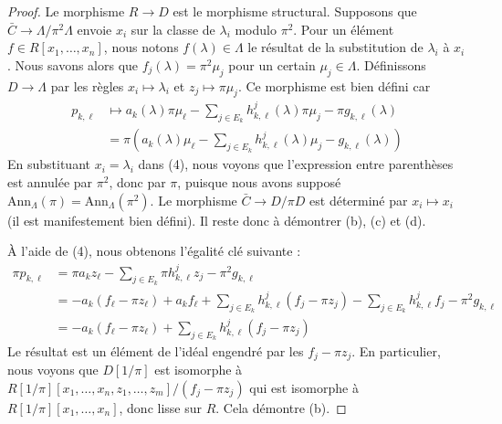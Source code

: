 \begin{proof}
\medskip\noindent
Le morphisme $R \to D$ est le morphisme structural.
Supposons que $\bar C \to \Lambda/\pi^2\Lambda$ envoie $x_i$
sur la classe de $\lambda_i$ modulo $\pi^2$. Pour un élément
$f \in R[x_1, \ldots, x_n]$, nous notons $f(\lambda) \in \Lambda$
le résultat de la substitution de $\lambda_i$ à $x_i$. Nous savons alors que
$f_j(\lambda) = \pi^2 \mu_j$ pour un certain $\mu_j \in \Lambda$.
Définissons $D \to \Lambda$ par les règles $x_i \mapsto \lambda_i$ et
$z_j \mapsto \pi\mu_j$. Ce morphisme est bien défini car
\begin{align*}
p_{k, \ell} & \mapsto
a_k(\lambda) \pi \mu_\ell -
\sum\nolimits_{j \in E_k} h_{k, \ell}^j(\lambda) \pi \mu_j
- \pi g_{k, \ell}(\lambda) \\
& =
\pi\left(a_k(\lambda) \mu_\ell -
\sum\nolimits_{j \in E_k} h_{k, \ell}^j(\lambda) \mu_j
- g_{k, \ell}(\lambda)\right)
\end{align*}
En substituant $x_i = \lambda_i$ dans (4), nous voyons que l'expression
entre parenthèses est annulée par $\pi^2$, donc par $\pi$, puisque nous avons supposé
$\text{Ann}_\Lambda(\pi) = \text{Ann}_\Lambda(\pi^2)$.
Le morphisme $\bar C \to D/\pi D$ est déterminé par $x_i \mapsto x_i$
(il est manifestement bien défini). Il reste donc à démontrer (b), (c) et (d).

\medskip\noindent
À l'aide de (4), nous obtenons l'égalité clé suivante :
\begin{align*}
\pi p_{k, \ell} & =
\pi a_k z_\ell - \sum\nolimits_{j \in E_k} \pi h_{k, \ell}^jz_j
- \pi^2 g_{k, \ell} \\
& =
- a_k (f_\ell - \pi z_\ell) + a_k f_\ell +
\sum\nolimits_{j \in E_k} h_{k, \ell}^j (f_j - \pi z_j) -
\sum\nolimits_{j \in E_k} h_{k, \ell}^j f_j - \pi^2 g_{k, \ell} \\
& =
-a_k(f_\ell - \pi z_\ell) +
\sum\nolimits_{j \in E_k} h_{k, \ell}^j(f_j - \pi z_j)
\end{align*}
Le résultat est un élément de l'idéal engendré par les $f_j - \pi z_j$.
En particulier, nous voyons que $D[1/\pi]$ est isomorphe à
$R[1/\pi][x_1, \ldots, x_n, z_1, \ldots, z_m]/(f_j - \pi z_j)$
qui est isomorphe à $R[1/\pi][x_1, \ldots, x_n]$, donc lisse
sur $R$. Cela démontre (b).


\end{proof}

